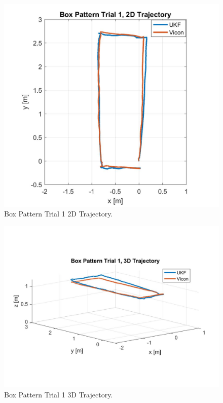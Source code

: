 \begin{figure}[p]
  \centering
    \includegraphics[height=0.4\textheight]{box1_2d}
  \caption[Box Pattern Trial 1 2D Trajectory]{Box Pattern Trial 1 2D Trajectory.}
  \label{fig:box1_2d}
\end{figure}
\begin{figure}[p]
  \centering
    \includegraphics[height=0.4\textheight]{box1_3d}
  \caption[Box Pattern Trial 1 3D Trajectory]{Box Pattern Trial 1 3D Trajectory.}
  \label{fig:box1_3d}
\end{figure}
\clearpage

